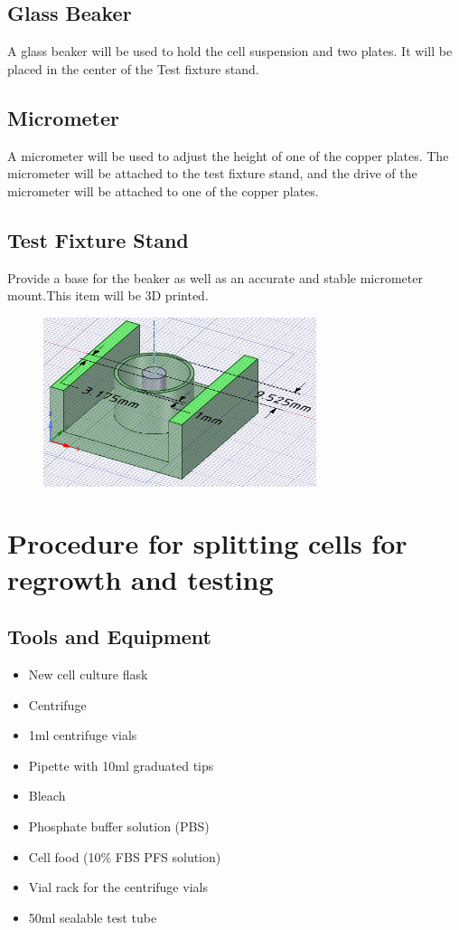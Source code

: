 \documentclass[journal]{IEEEtran}
\begin{document}
\subsection{Glass Beaker}
A glass beaker will be used to hold the cell suspension and two plates. It will be placed in the center of the Test fixture stand.

\subsection{Micrometer}
A micrometer will be used to adjust the height of one of the copper plates. The micrometer will be attached to the test fixture stand, and the drive of the micrometer will be attached to one of the copper plates.

\subsection{Test Fixture Stand}
Provide a base for the beaker as well as an accurate and stable micrometer mount.This item will be 3D printed.

\begin{figure}[h]
\label{test-fixture}
\includegraphics[width=8cm]{Combined_Test_Fixture_Beaker_View.png}
\end{figure}

\section{Procedure for splitting cells for regrowth and testing}
\subsection{Tools and Equipment}
\begin{itemize}
\item New cell culture flask
\item Centrifuge
\item 1ml centrifuge vials 
\item Pipette with 10ml graduated tips
\item Bleach
\item Phosphate buffer solution (PBS)
\item Cell food (10\% FBS PFS solution)
\item Vial rack for the centrifuge vials
\item 50ml sealable test tube
\end{itemize}
\end{document}
